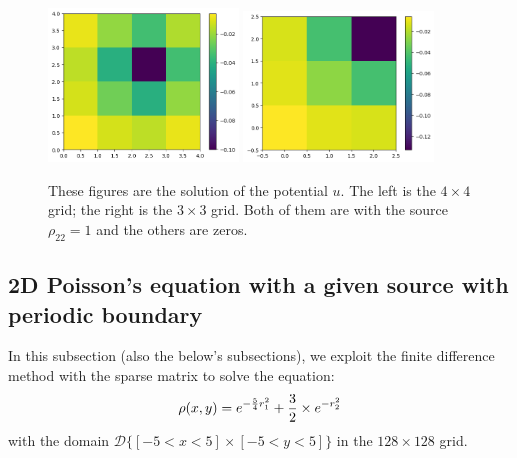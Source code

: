 \documentclass[12pt]{article}
\begin{document}
    \begin{figure}[H]
        \centering 
        \includegraphics[width = 0.45\textwidth]{./fig/1.1.png}
        \includegraphics[width = 0.45\textwidth]{./fig/1.2.png} 
        \caption{These figures are the solution of the potential $u$. The left is the $4 \times 4$ grid; the right is the $3 \times 3$ grid. Both of them are with the source $\rho_{22} = 1$ and the others are zeros.}\label{q1}
    \end{figure}

    \subsection{2D Poisson's equation with a given source with periodic boundary}\label{eq}
    In this subsection (also the below's subsections), we exploit the finite difference method with the sparse matrix to solve the equation:
    \[
        \rho(x,y) = e^{-{5 \over 4} r^{2}_{1}} + {3 \over 2} \times e^{-r^{2}_{2}}
    \]
    with the domain $\mathscr{D}\big\{ [-5 < x < 5] \times [-5 < y < 5] \big\}$ in the $128 \times 128$ grid.
\end{document}
